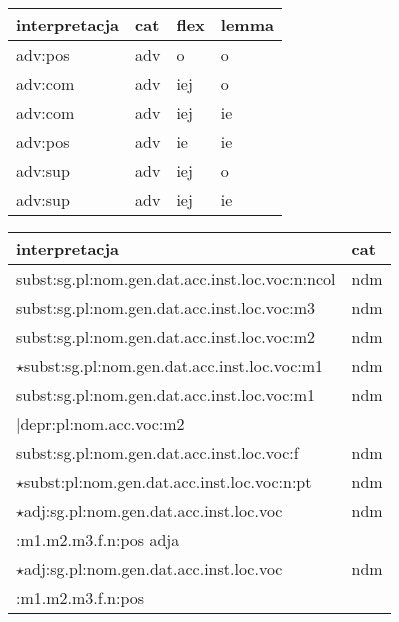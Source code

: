 \documentclass{article}
\begin{document}
\begin{longtable}{p{7cm}|l|l|l}
interpretacja & cat & flex & lemma\\
\hline
adv:pos & adv & o & o\\
adv:com & adv & iej & o\\
adv:com & adv & iej & ie\\
adv:pos & adv & ie & ie\\
adv:sup & adv & iej & o\\
adv:sup & adv & iej & ie\\
\end{longtable}
\begin{longtable}{p{7cm}|l}
interpretacja & cat\\
\hline
subst:sg.pl:nom.gen.dat.acc.inst.loc.voc:n:ncol & ndm\\
subst:sg.pl:nom.gen.dat.acc.inst.loc.voc:m3 & ndm\\
subst:sg.pl:nom.gen.dat.acc.inst.loc.voc:m2 & ndm\\
$\star$subst:sg.pl:nom.gen.dat.acc.inst.loc.voc:m1 & ndm\\
subst:sg.pl:nom.gen.dat.acc.inst.loc.voc:m1 & ndm\\
	\quad \quad |depr:pl:nom.acc.voc:m2 & \\
subst:sg.pl:nom.gen.dat.acc.inst.loc.voc:f & ndm\\
$\star$subst:pl:nom.gen.dat.acc.inst.loc.voc:n:pt & ndm\\
$\star$adj:sg.pl:nom.gen.dat.acc.inst.loc.voc & ndm\\
	\quad \quad :m1.m2.m3.f.n:pos adja & \\
$\star$adj:sg.pl:nom.gen.dat.acc.inst.loc.voc & ndm\\
	\quad \quad :m1.m2.m3.f.n:pos & \\
\end{longtable}
\end{document}
